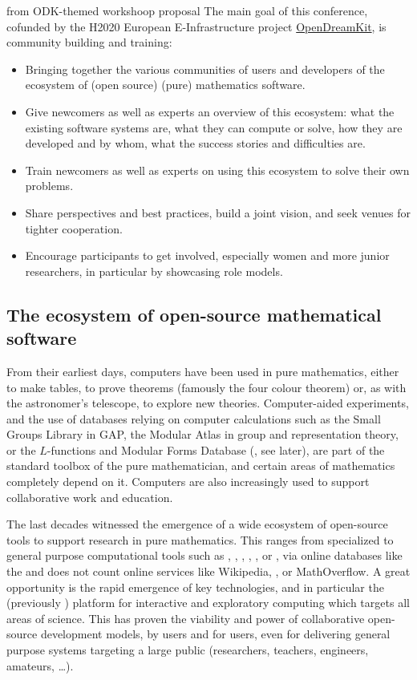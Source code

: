 \begin{oldpart}{from ODK-themed workshoop proposal}
The main goal of this conference, cofunded by the H2020 European
E-Infrastructure project \href{opendreamkit.org}{OpenDreamKit}, is
community building and training:
\begin{itemize}
\item Bringing together the various communities of users and
  developers of the ecosystem of (open source) (pure) mathematics
  software.
\item Give newcomers as well as experts an overview of this ecosystem:
  what the existing software systems are, what they can compute or solve, how
  they are developed and by whom, what the success stories and
  difficulties are.
\item Train newcomers as well as experts on using this ecosystem to
  solve their own problems.
\item Share perspectives and best practices, build a joint vision, and
  seek venues for tighter cooperation.
\item Encourage participants to get involved, especially
  women and more junior researchers, in particular by showcasing role models.
\end{itemize}


\subsection{The ecosystem of open-source mathematical software}

From their earliest days, computers have been used in pure
mathematics, either to make tables, to prove theorems (famously the
four colour theorem) or, as with the astronomer's telescope, to
explore new theories. Computer-aided experiments, and the use of
databases relying on computer calculations such as the Small Groups
Library in GAP, the Modular Atlas in group and representation theory,
or the $L$-functions and Modular Forms Database (\LMFDB, see later),
are part of the standard toolbox of the pure mathematician, and
certain areas of mathematics completely depend on it. Computers are
also increasingly used to support collaborative work and education.

The last decades witnessed the emergence of a wide ecosystem of
open-source tools to support research in pure mathematics. This ranges
from specialized to general purpose computational tools such as \GAP,
\PariGP, \Linbox, \MPIR, \Sage, or \Singular, via online databases
like the \LMFDB and does not count online services like Wikipedia,
\Arxiv, or MathOverflow. A great opportunity is the rapid emergence of
key technologies, and in particular the \Jupyter (previously \IPython)
platform for interactive and exploratory computing which targets all
areas of science. This has proven the viability and power of
collaborative open-source development models, by users and for users,
even for delivering general purpose systems targeting a large public
(researchers, teachers, engineers, amateurs, \ldots).


\end{oldpart}
